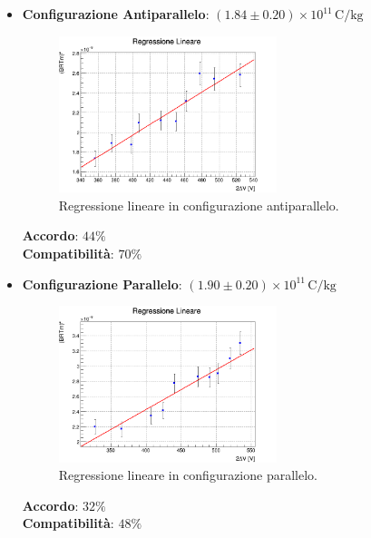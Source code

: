 \documentclass[a4paper,12pt]{article}
\begin{document}
\begin{itemize}

    \item \textbf{Configurazione Antiparallelo}: \( (1.84 \pm 0.20) \times 10^{11} \, \text{C/kg}\)
    \begin{figure}[H]
        \centering
        \includegraphics[width=0.6\textwidth]{correz_regr_antiparallelo.png}
        \caption{Regressione lineare in configurazione antiparallelo.}
        \label{fig:correz_regr_antiparallelo}
    \end{figure}
    \textbf{Accordo}: \(44\%\) \\
    \textbf{Compatibilità}: \(70\%\)
    \vspace{0.5cm}

    \item \textbf{Configurazione Parallelo}: \( (1.90 \pm 0.20) \times 10^{11} \, \text{C/kg}\)
    \begin{figure}[H]
        \centering
        \includegraphics[width=0.6\textwidth]{correz_regr_parallelo.png}
        \caption{Regressione lineare in configurazione parallelo.}
        \label{fig:correz_regr_parallelo}
    \end{figure}
    \textbf{Accordo}: \(32\%\) \\
    \textbf{Compatibilità}: \(48\%\)
\end{itemize}
\end{document}
